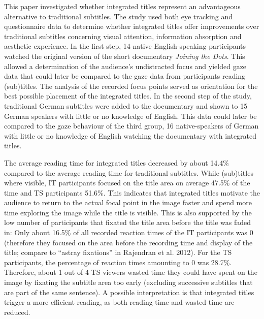\documentclass[output=paper]{langsci/langscibook}
\begin{document}
This paper investigated whether integrated titles represent an advantageous alternative to traditional subtitles. The study used both eye tracking and questionnaire data to determine whether integrated titles offer improvements over traditional subtitles concerning visual attention, information absorption and aesthetic experience. In the first step, 14 native English-speaking participants watched the original version of the short documentary \textit{Joining the Dots}. This allowed a determination of the audience’s undistracted focus and yielded gaze data that could later be compared to the gaze data from participants reading (sub)titles. The analysis of the recorded focus points served as orientation for the best possible placement of the integrated titles. In the second step of the study, traditional German subtitles were added to the documentary and shown to 15 German speakers with little or no knowledge of English. This data could later be compared to the gaze behaviour of the third group, 16 native-speakers of German with little or no knowledge of English watching the documentary with integrated titles.


The average reading time for integrated titles decreased by about 14.4\% compared to the average reading time for traditional subtitles. While (sub)titles where visible, IT participants focused on the title area on average 47.5\% of the time and TS participants 51.6\%. This indicates that integrated titles motivate the audience to return to the actual focal point in the image faster and spend more time exploring the image while the title is visible. This is also supported by the low number of participants that fixated the title area before the title was faded in: Only about 16.5\% of all recorded reaction times of the IT participants was 0 (therefore they focused on the area before the recording time and display of the title; compare to “astray fixations” in Rajendran et al. 2012). For the TS participants, the percentage of reaction times amounting to 0 was 28.7\%. Therefore, about 1 out of 4 TS viewers wasted time they could have spent on the image by fixating the subtitle area too early (excluding successive subtitles that are part of the same sentence). A possible interpretation is that integrated titles trigger a more efficient reading, as both reading time and wasted time are reduced.
\end{document}
